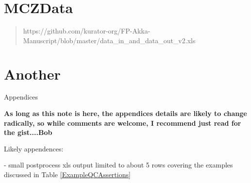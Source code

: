 \begin{appendices}
\section{MCZData}
\begin{quote}https://github.com/kurator-org/FP-Akka-Manuscript/blob/master/data\_in\_and\_data\_out\_v2.xls\end{quote}
\section{Another}
\appendix
\newpage
\begin{center}
\Huge{Appendices}
\end{center}
\textbf{As long as this note is here, the appendices details are likely to change radically, so while comments are welcome, I recommend just read for the gist....Bob}

Likely appendences:

- small postprocess xls output limited to about 5 rows covering the examples discussed in Table  \ref{ExampleQCAssertions}

\begin{lstlisting}
\end{lstlisting}

\end{appendices}
